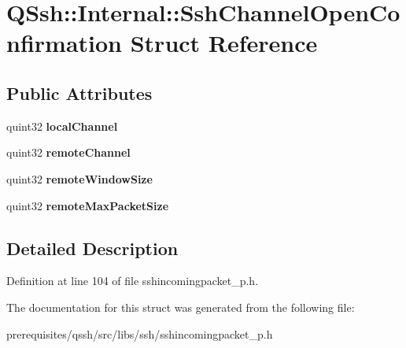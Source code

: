 \hypertarget{struct_q_ssh_1_1_internal_1_1_ssh_channel_open_confirmation}{}\section{Q\+Ssh\+:\+:Internal\+:\+:Ssh\+Channel\+Open\+Confirmation Struct Reference}
\label{struct_q_ssh_1_1_internal_1_1_ssh_channel_open_confirmation}
\subsection*{Public Attributes}
\begin{DoxyCompactItemize}
\item 
\mbox{\label{struct_q_ssh_1_1_internal_1_1_ssh_channel_open_confirmation_afc8aea7c192abebb10ea7fd0325d6e11}} 
quint32 {\bfseries local\+Channel}
\item 
\mbox{\label{struct_q_ssh_1_1_internal_1_1_ssh_channel_open_confirmation_acb206fdca920b5ee4339b53dd145744d}} 
quint32 {\bfseries remote\+Channel}
\item 
\mbox{\label{struct_q_ssh_1_1_internal_1_1_ssh_channel_open_confirmation_a84aa89548bddd0ad909d7e6538d02db8}} 
quint32 {\bfseries remote\+Window\+Size}
\item 
\mbox{\label{struct_q_ssh_1_1_internal_1_1_ssh_channel_open_confirmation_a4be1a8dd8ab829fafb32c1b50bdbee1b}} 
quint32 {\bfseries remote\+Max\+Packet\+Size}
\end{DoxyCompactItemize}


\subsection{Detailed Description}


Definition at line 104 of file sshincomingpacket\+\_\+p.\+h.



The documentation for this struct was generated from the following file\+:\begin{DoxyCompactItemize}
\item 
prerequisites/qssh/src/libs/ssh/sshincomingpacket\+\_\+p.\+h\end{DoxyCompactItemize}
